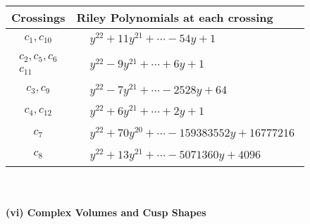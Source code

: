 \documentclass[1p]{elsarticle_modified}
\theoremstyle{definition}
\begin{document}
\begin{tabular}{m{50pt}|m{274pt}}
Crossings & \hspace{64pt}Riley Polynomials at each crossing \\
\hline $$\begin{aligned}c_{1},c_{10}\end{aligned}$$&$\begin{aligned}
&y^{22}+11 y^{21}+\cdots-54 y+1
\end{aligned}$\\
\hline $$\begin{aligned}c_{2},c_{5},c_{6}\\c_{11}\end{aligned}$$&$\begin{aligned}
&y^{22}-9 y^{21}+\cdots+6 y+1
\end{aligned}$\\
\hline $$\begin{aligned}c_{3},c_{9}\end{aligned}$$&$\begin{aligned}
&y^{22}-7 y^{21}+\cdots-2528 y+64
\end{aligned}$\\
\hline $$\begin{aligned}c_{4},c_{12}\end{aligned}$$&$\begin{aligned}
&y^{22}+6 y^{21}+\cdots+2 y+1
\end{aligned}$\\
\hline $$\begin{aligned}c_{7}\end{aligned}$$&$\begin{aligned}
&y^{22}+70 y^{20}+\cdots-159383552 y+16777216
\end{aligned}$\\
\hline $$\begin{aligned}c_{8}\end{aligned}$$&$\begin{aligned}
&y^{22}+13 y^{21}+\cdots-5071360 y+4096
\end{aligned}$\\
\hline
\end{tabular}\\~\\
\newpage\flushleft \textbf{(vi) Complex Volumes and Cusp Shapes}
\end{document}
